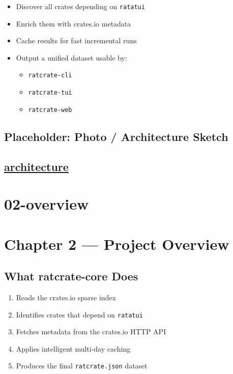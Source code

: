 \documentclass[
  letterpaper,
  DIV=11,
  numbers=noendperiod]{scrreprt}
\providecommand{\tightlist}{%
  \setlength{\itemsep}{0pt}\setlength{\parskip}{0pt}}
\begin{document}
\begin{itemize}
\tightlist
\item
  Discover all crates depending on \texttt{ratatui}
\item
  Enrich them with crates.io metadata
\item
  Cache results for fast incremental runs
\item
  Output a unified dataset usable by:

  \begin{itemize}
  \tightlist
  \item
    \texttt{ratcrate-cli}
  \item
    \texttt{ratcrate-tui}
  \item
    \texttt{ratcrate-web}
  \end{itemize}
\end{itemize}

\section{Placeholder: Photo / Architecture
Sketch}\label{placeholder-photo-architecture-sketch}

\section{\texorpdfstring{\href{}{architecture}}{architecture}}\label{architecture}

\chapter{02-overview}\label{overview-1}

\chapter{Chapter 2 --- Project
Overview}\label{chapter-2-project-overview}

\section{What ratcrate-core Does}\label{what-ratcrate-core-does}

\begin{enumerate}
\def\labelenumi{\arabic{enumi}.}
\tightlist
\item
  Reads the crates.io sparse index
\item
  Identifies crates that depend on \texttt{ratatui}
\item
  Fetches metadata from the crates.io HTTP API
\item
  Applies intelligent multi-day caching
\item
  Produces the final \texttt{ratcrate.json} dataset
\end{enumerate}
\end{document}
